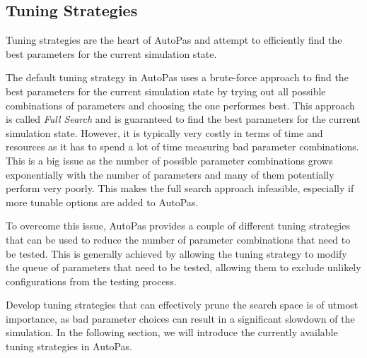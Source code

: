 \subsection{Tuning Strategies}

Tuning strategies are the heart of AutoPas and attempt to efficiently find the best parameters for the current simulation state.

The default tuning strategy in AutoPas uses a brute-force approach to find the best parameters for the current simulation state by trying out all possible combinations of parameters and choosing the one performes best. This approach is called \emph{Full Search} and is guaranteed to find the best parameters for the current simulation state. However, it is typically very costly in terms of time and resources as it has to spend a lot of time measuring bad parameter combinations. This is a big issue as the number of possible parameter combinations grows exponentially with the number of parameters and many of them potentially perform very poorly. This makes the full search approach infeasible, especially if more tunable options are added to AutoPas.

To overcome this issue, AutoPas provides a couple of different tuning strategies that can be used to reduce the number of parameter combinations that need to be tested. This is generally achieved by allowing the tuning strategy to modify the queue of parameters that need to be tested, allowing them to exclude unlikely configurations from the testing process.

Develop tuning strategies that can effectively prune the search space is of utmost importance, as bad parameter choices can result in a significant slowdown of the simulation. In the following section, we will introduce the currently available tuning strategies in AutoPas.

